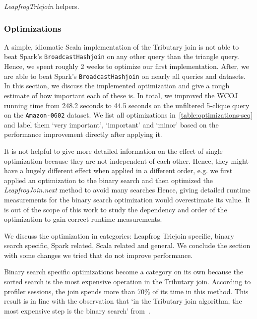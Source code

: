 \begin{listing}[H]
    \inputminted{scala}{code/LeapfrogTriejoinHelpers.scala}
    \caption{\textit{LeapfrogTriejoin} helpers.}
    \label{lst:leapfrog-triejoin-helpers}
\end{listing}

\subsubsection{Optimizations}
A simple, idiomatic Scala implementation of the Tributary join is not able to beat Spark's \texttt{BroadcastHashjoin} on any other query than the triangle query.
Hence, we spent roughly 2 weeks to optimize our first implementation.
After, we are able to beat Spark's \texttt{BroadcastHashjoin} on nearly all queries and datasets.
In this section, we discuss the implemented optimization and give a rough estimate of how important each of these is.
In total, we improved the WCOJ running time from 248.2 seconds to 44.5 seconds on the unfiltered 5-clique query on the
\texttt{Amazon-0602} dataset.
We list all optimizations in~\cref{table:optimizations-seq} and label them `very important', `important' and `minor' based on the performance improvement directly after applying it.

It is not helpful to give more detailed information on the effect of single optimization because they are not independent of each other.
Hence, they might have a hugely different effect when applied in a different order, e.g. we first applied an optimization to the binary search and then
optimized the \textit{LeapfrogJoin.next} method to avoid many searches
Hence, giving detailed runtime measurements for the binary search optimization would overestimate its value.
It is out of the scope of this work to study the dependency and order of the optimization to gain correct runtime measurements.

We discuss the optimization in categories: Leapfrog Triejoin specific, binary search specific, Spark related, Scala related and general.
We conclude the section with some changes we tried that do not improve performance.

Binary search specific optimizations become a category on its own because the sorted search is the most expensive operation in the Tributary join.
According to profiler sessions, the join spends more than 70\% of its time in this method. %
This result is in line with the observation that `in the Tributary join algorithm, the most expensive step is the binary search' from~\cite{myria-detailed}.

